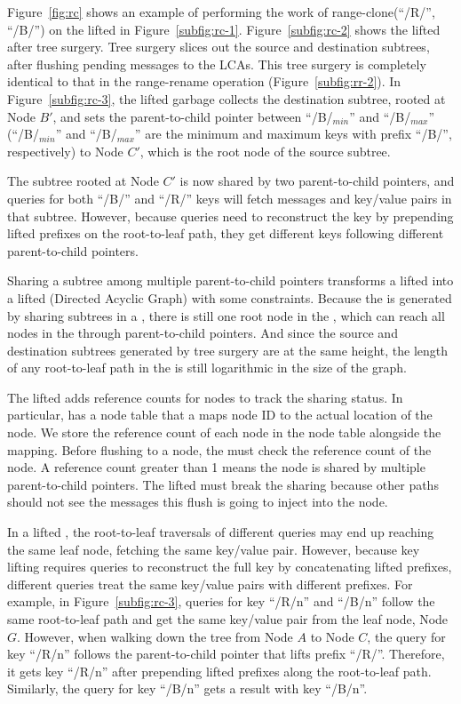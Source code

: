 Figure~\ref{fig:rc} shows an example of performing the work of
range-clone(``/R/'', ``/B/'') on the lifted \bet in Figure~\ref{subfig:rc-1}.
Figure~\ref{subfig:rc-2} shows the lifted \bet after tree surgery.
Tree surgery slices out the source and destination subtrees,
after flushing pending messages to the LCAs.
This tree surgery is completely identical to that in the range-rename operation
(Figure~\ref{subfig:rr-2}).
In Figure~\ref{subfig:rc-3}, the lifted \bet garbage collects the destination
subtree, rooted at Node $B'$, and sets the parent-to-child pointer between
``/B/$_{min}$'' and ``/B/$_{max}$''
(``/B/$_{min}$'' and ``/B/$_{max}$'' are the minimum and maximum keys with
prefix ``/B/'', respectively)
to Node $C'$,
which is the root node of the source subtree.

The subtree rooted at Node $C'$ is now shared by two parent-to-child pointers,
and queries for
both ``/B/'' and ``/R/'' keys will fetch messages and key/value pairs in that
subtree.
However, because queries need to reconstruct the key by prepending lifted
prefixes on the root-to-leaf path, they get different keys following different
parent-to-child pointers.

Sharing a subtree among multiple parent-to-child pointers transforms a lifted
\bet into a lifted \bedag (Directed Acyclic Graph) with some constraints.
Because the \bedag is generated by sharing subtrees in a \bet,
there is still one root node in the \bedag,
which can reach all nodes in the \bedag through parent-to-child pointers.
And since the source and destination subtrees generated by tree surgery are at
the same height, the length of any root-to-leaf path in the \bedag is still
logarithmic in the size of the graph.

The lifted \bedag adds reference counts for \bet nodes to track the sharing
status.
In particular, \fti has a node table that a maps node ID to
the actual location of the node.
We store the reference count of each node in the node table alongside
the mapping.
Before flushing to a node, the \bedag must check the reference count of the node.
A reference count greater than 1 means the node is shared by multiple
parent-to-child pointers.
The lifted \bedag must break the sharing because other paths should not see the
messages this flush is going to inject into the node.

In a lifted \bedag, the root-to-leaf traversals of different queries may end up
reaching the same leaf node, fetching the same key/value pair.
However, because key lifting requires queries to reconstruct the full key by
concatenating lifted prefixes, different queries treat the same key/value pairs
with different prefixes.
For example, in Figure~\ref{subfig:rc-3}, queries for key ``/R/n'' and ``/B/n''
follow the same root-to-leaf path and get the same key/value pair from the
leaf node, Node $G$.
However, when walking down the tree from Node $A$ to Node $C$, the query for
key ``/R/n'' follows the parent-to-child pointer that lifts prefix ``/R/''.
Therefore, it gets key ``/R/n'' after prepending lifted prefixes along the
root-to-leaf path.
Similarly, the query for key ``/B/n'' gets a result with key ``/B/n''.

